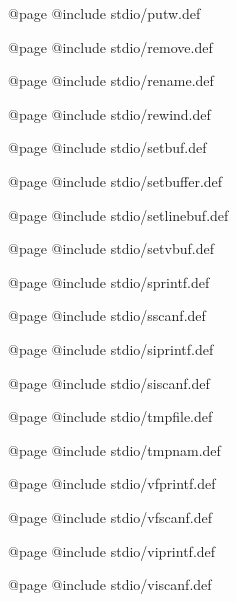 @page 
@include stdio/putw.def 

@page
@include stdio/remove.def

@page
@include stdio/rename.def

@page
@include stdio/rewind.def

@page
@include stdio/setbuf.def

@page
@include stdio/setbuffer.def

@page
@include stdio/setlinebuf.def

@page
@include stdio/setvbuf.def

@page 
@include stdio/sprintf.def 

@page
@include stdio/sscanf.def 

@page 
@include stdio/siprintf.def 

@page 
@include stdio/siscanf.def 

@page
@include stdio/tmpfile.def

@page
@include stdio/tmpnam.def

@page 
@include stdio/vfprintf.def 

@page
@include stdio/vfscanf.def

@page 
@include stdio/viprintf.def 

@page 
@include stdio/viscanf.def 

